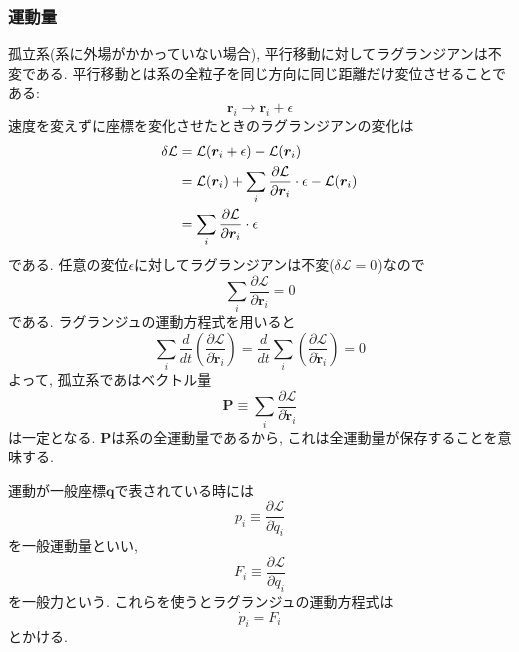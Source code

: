 \subsubsection{運動量}
孤立系(系に外場がかかっていない場合), 平行移動に対してラグランジアンは不変である.
平行移動とは系の全粒子を同じ方向に同じ距離だけ変位させることである:
\begin{equation}
 \bm{r}_{i} \to \bm{r}_{i} + \epsilon
\end{equation}
速度を変えずに座標を変化させたときのラグランジアンの変化は
\begin{align}
  \delta \mathcal{L}
&=\mathcal{L}(\bm{r}_{i} + \epsilon) - \mathcal{L}(\bm{r}_{i})
  \notag
  \\
&=\mathcal{L}(\bm{r}_{i})
 +\sum_{i} \frac{\partial \mathcal{L}}{\partial \bm{r}_{i}} \cdot \epsilon
 -\mathcal{L}(\bm{r}_{i})
  \notag
  \\
&=\sum_{i} \frac{\partial \mathcal{L}}{\partial \bm{r}_{i}} \cdot \epsilon
\end{align}
である.
任意の変位$\epsilon$に対してラグランジアンは不変($\delta \mathcal{L} = 0$)なので
\begin{equation}
 \sum_{i} \frac{\partial \mathcal{L}}{\partial \bm{r}_{i}} = 0
\end{equation}
である.
ラグランジュの運動方程式を用いると
\begin{equation}
 \sum_{i} \frac{d}{dt}
 \left(\frac{\partial \mathcal{L}}{\partial \dot{\bm{r}}_{i}} \right)
=\frac{d}{dt} \sum_{i} \left(\frac{\partial \mathcal{L}}{\partial \dot{\bm{r}}_{i}}\right)
=0
\end{equation}
よって, 孤立系であはベクトル量
\begin{equation}
 \bm{P} \equiv \sum_{i} \frac{\partial \mathcal{L}}{\partial \dot{\bm{r}}_{i}}
\end{equation}
は一定となる.
$\bm{P}$は系の全運動量であるから,
これは全運動量が保存することを意味する.

運動が一般座標$\bm{q}$で表されている時には
\begin{equation}
 p_{i} \equiv \frac{\partial \mathcal{L}}{\partial \dot{q}_{i}}
\end{equation}
を一般運動量といい,
\begin{equation}
 F_{i} \equiv \frac{\partial \mathcal{L}}{\partial q_{i}}
\end{equation}
を一般力という.
これらを使うとラグランジュの運動方程式は
\begin{equation}
 \dot{p}_{i} = F_{i}
\end{equation}
とかける.

